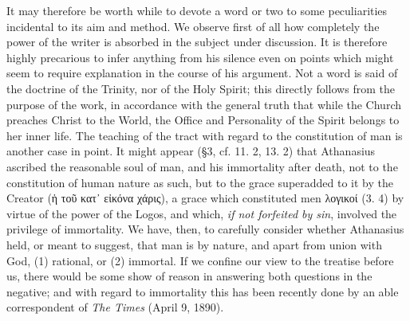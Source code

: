 It may therefore be worth while to devote a word or two to some peculiarities incidental to its aim and method. We observe first of all how completely the power of the writer is absorbed in the subject under discussion. It is therefore highly precarious to infer anything from his silence even on points which might seem to require explanation in the course of his argument. Not a word is said of the doctrine of the Trinity, nor of the Holy Spirit; this directly follows from the purpose of the work, in accordance with the general truth that while the Church preaches Christ to the World, the Office and Personality of the Spirit belongs to her inner life. The teaching of the tract with regard to the constitution of man is another case in point. It might appear (§3, cf. 11. 2, 13. 2) that Athanasius ascribed the reasonable soul of man, and his immortality after death, not to the constitution of human nature as such, but to the grace superadded to it by the Creator (\textgreek{ἡ τοῦ κατ᾽ εἰκόνα χάρις}), a grace which constituted men \textgreek{λογικοί} (3. 4) by virtue of the power of the Logos, and which, \emph{if not forfeited by sin}, involved the privilege of immortality. We have, then, to carefully consider whether Athanasius held, or meant to suggest, that man is by nature, and apart from union with God, (1) rational, or (2) immortal. If we confine our view to the treatise before us, there would be some show of reason in answering both questions in the negative; and with regard to immortality this has been recently done by an able correspondent of \emph{The Times} (April 9, 1890).

